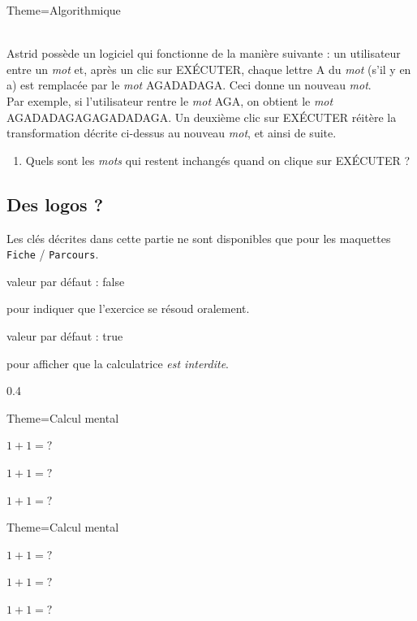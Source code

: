 \documentclass[12pt,french]{article}
\newcommand\Cle[1]{%
  {\sffamily\textlangle #1\textrangle}%
}%
\newcommand{\Defaut}[1]{%
\hfill valeur par défaut : {\sffamily #1}\par%
}%
\newenvironment{Description}
               {\list{}{\labelwidth0pt \leftmargin0pt \itemindent-\leftmargin
                        \let\makelabel\Descriptionlabel}}
               {\endlist}
\newcommand*\Descriptionlabel[1]{\hspace\labelsep
                                \normalfont\bfseries #1}
\begin{document}
\begin{Description}
\begin{Maquette}[Fiche]{Theme=Algorithmique}
\begin{exercice}[Source=Olympiades 2019,Titre=Modifier des mots,Competence=Raisonner]
    \\Astrid possède un logiciel qui fonctionne de la manière suivante : un utilisateur entre un {\em mot} et, après un clic sur EXÉCUTER, chaque lettre A du {\em mot} (s'il y en a) est remplacée par le {\em mot} AGADADAGA. Ceci donne un nouveau {\em mot}.\\Par exemple, si l'utilisateur rentre le {\em mot} AGA, on obtient le {\em mot} AGADADAGAGAGADADAGA. Un deuxième clic sur EXÉCUTER réitère la transformation décrite ci-dessus au nouveau {\em mot}, et ainsi de suite.
    \begin{enumerate}
    \item Quels sont les {\em mots} qui restent inchangés quand on clique sur EXÉCUTER ?
    \end{enumerate}
\end{exercice}
\end{Maquette}
\end{Description}
\clearpage
\subsection*{Des logos ?}
Les clés décrites dans cette partie ne sont disponibles que pour les maquettes
\lstinline!Fiche! / \lstinline!Parcours!.
\begin{Description}
\item[La clé \Cle{Oral}]\Defaut{false}\par
  pour indiquer que l'exercice se résoud oralement.
\item[La clé \Cle{Calculatrice}]\Defaut{true}\par
  pour afficher que la calculatrice {\em est interdite}.
\end{Description}
  \begin{Codes}[listing only,listing options={frame=,escapechar=!}]{0.4}{}
\begin{Maquette}[Fiche]{Theme=Calcul mental}
  \begin{exercice}[Oral]
    $1+1=?$
  \end{exercice}
  \begin{exercice}[!\color{DarkGreen}\ttfamily Calculatrice!=false]
    $1+1=?$
  \end{exercice}
  \begin{exercice}[!\color{DarkGreen}\ttfamily Calculatrice!=false,Oral]
    $1+1=?$
  \end{exercice}
\end{Maquette}
\end{Codes}
\begin{Maquette}[Fiche]{Theme=Calcul mental}
  \begin{exercice}[Oral]
    $1+1=?$
  \end{exercice}
  \begin{exercice}[Calculatrice=false]
    $1+1=?$
  \end{exercice}
  \begin{exercice}[Calculatrice=false,Oral]
    $1+1=?$
  \end{exercice}
\end{Maquette}
\clearpage
\end{document}
